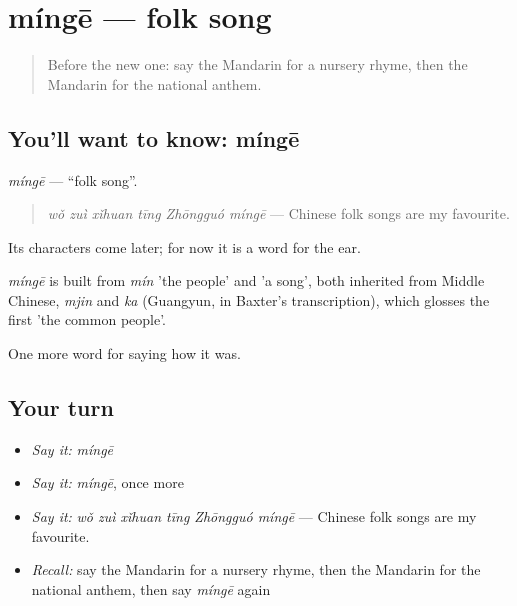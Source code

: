 \section[míngē]{míngē — folk song}

\label{lesson:ZH-C504-minge}



\begin{quote}
Before the new one: say the Mandarin for a nursery rhyme, then the Mandarin for the national anthem.
\end{quote}

\subsection*{You'll want to know: míngē}
\emph{míngē} — \textquotedblleft{}folk song\textquotedblright{}.

\begin{quote}
\emph{wǒ zuì xǐhuan tīng Zhōngguó míngē} — Chinese folk songs are my favourite.
\end{quote}

Its characters come later; for now it is a word for the ear.

\begin{cousinweb}
\emph{míngē} is built from \emph{mín} 'the people' and  'a song', both inherited from Middle Chinese, \emph{mjin} and \emph{ka} (Guangyun, in Baxter's transcription), which glosses the first 'the common people'.
\end{cousinweb}

\begin{grammarlens}[title={What you've built}]
One more word for saying how it was.
\end{grammarlens}

\subsection*{Your turn}
\begin{itemize}
\raggedright
  \item \emph{Say it:} \emph{míngē}
  \item \emph{Say it:} \emph{míngē}, once more
  \item \emph{Say it:} \emph{wǒ zuì xǐhuan tīng Zhōngguó míngē} — Chinese folk songs are my favourite.
  \item \emph{Recall:} say the Mandarin for a nursery rhyme, then the Mandarin for the national anthem, then say \emph{míngē} again
\end{itemize}

